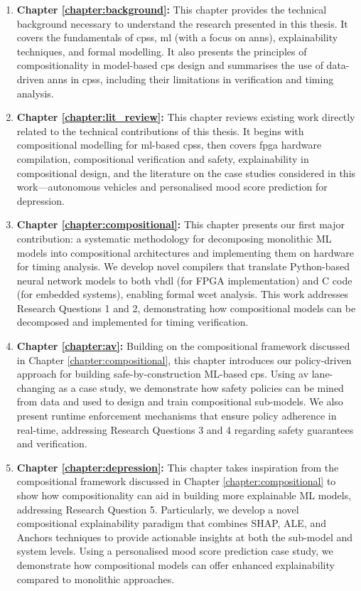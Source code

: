 \begin{enumerate}
 \item \textbf{Chapter \ref{chapter:background}:} This chapter provides the technical background necessary to understand the research presented in this thesis. It covers the fundamentals of \glspl{cps}, \gls{ml} (with a focus on \glspl{ann}), explainability techniques, and formal modelling. It also presents the principles of compositionality in model-based \gls{cps} design and summarises the use of data-driven \glspl{ann} in \glspl{cps}, including their limitations in verification and timing analysis.

 \item \textbf{Chapter \ref{chapter:lit_review}:} This chapter reviews existing work directly related to the technical contributions of this thesis. It begins with compositional modelling for \gls{ml}-based \glspl{cps}, then covers \gls{fpga} hardware compilation, compositional verification and safety, explainability in compositional design, and the literature on the case studies considered in this work---autonomous vehicles and personalised mood score prediction for depression.

 \item \textbf{Chapter \ref{chapter:compositional}:}  This chapter presents our first major contribution: a systematic methodology for decomposing monolithic ML models into compositional architectures and implementing them on hardware for timing analysis. We develop novel compilers that translate Python-based neural network models to both \gls{vhdl} (for FPGA implementation) and C code (for embedded systems), enabling formal \gls{wcet} analysis. This work addresses Research Questions 1 and 2, demonstrating how compositional models can be decomposed and implemented for timing verification.

 \item \textbf{Chapter \ref{chapter:av}:} Building on the compositional framework discussed in Chapter \ref{chapter:compositional}, this chapter introduces our policy-driven approach for building safe-by-construction ML-based \gls{cps}. Using  \gls{av} lane-changing as a case study, we demonstrate how safety policies can be mined from data and used to design and train compositional sub-models. We also present runtime enforcement mechanisms that ensure policy adherence in real-time, addressing Research Questions 3 and 4 regarding safety guarantees and verification.

 \item \textbf{Chapter \ref{chapter:depression}:} This chapter takes inspiration from the compositional framework discussed in Chapter \ref{chapter:compositional} to show how compositionality can aid in building more explainable ML models, addressing Research Question 5. Particularly, we develop a novel compositional explainability paradigm that combines SHAP, ALE, and Anchors techniques to provide actionable insights at both the sub-model and system levels. Using a personalised mood score prediction case study, we demonstrate how compositional models can offer enhanced explainability compared to monolithic approaches.


\end{enumerate}
